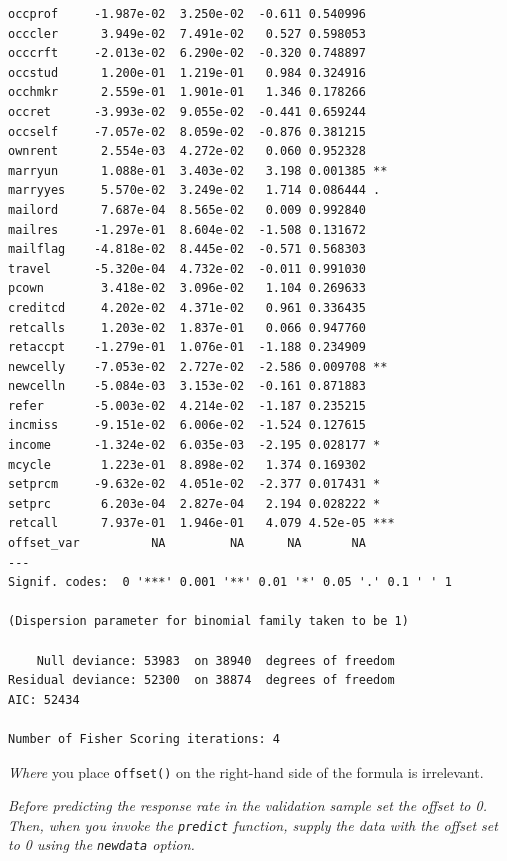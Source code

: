 \documentclass[
]{article}
\begin{document}
\begin{verbatim}
occprof     -1.987e-02  3.250e-02  -0.611 0.540996    
occcler      3.949e-02  7.491e-02   0.527 0.598053    
occcrft     -2.013e-02  6.290e-02  -0.320 0.748897    
occstud      1.200e-01  1.219e-01   0.984 0.324916    
occhmkr      2.559e-01  1.901e-01   1.346 0.178266    
occret      -3.993e-02  9.055e-02  -0.441 0.659244    
occself     -7.057e-02  8.059e-02  -0.876 0.381215    
ownrent      2.554e-03  4.272e-02   0.060 0.952328    
marryun      1.088e-01  3.403e-02   3.198 0.001385 ** 
marryyes     5.570e-02  3.249e-02   1.714 0.086444 .  
mailord      7.687e-04  8.565e-02   0.009 0.992840    
mailres     -1.297e-01  8.604e-02  -1.508 0.131672    
mailflag    -4.818e-02  8.445e-02  -0.571 0.568303    
travel      -5.320e-04  4.732e-02  -0.011 0.991030    
pcown        3.418e-02  3.096e-02   1.104 0.269633    
creditcd     4.202e-02  4.371e-02   0.961 0.336435    
retcalls     1.203e-02  1.837e-01   0.066 0.947760    
retaccpt    -1.279e-01  1.076e-01  -1.188 0.234909    
newcelly    -7.053e-02  2.727e-02  -2.586 0.009708 ** 
newcelln    -5.084e-03  3.153e-02  -0.161 0.871883    
refer       -5.003e-02  4.214e-02  -1.187 0.235215    
incmiss     -9.151e-02  6.006e-02  -1.524 0.127615    
income      -1.324e-02  6.035e-03  -2.195 0.028177 *  
mcycle       1.223e-01  8.898e-02   1.374 0.169302    
setprcm     -9.632e-02  4.051e-02  -2.377 0.017431 *  
setprc       6.203e-04  2.827e-04   2.194 0.028222 *  
retcall      7.937e-01  1.946e-01   4.079 4.52e-05 ***
offset_var          NA         NA      NA       NA    
---
Signif. codes:  0 '***' 0.001 '**' 0.01 '*' 0.05 '.' 0.1 ' ' 1

(Dispersion parameter for binomial family taken to be 1)

    Null deviance: 53983  on 38940  degrees of freedom
Residual deviance: 52300  on 38874  degrees of freedom
AIC: 52434

Number of Fisher Scoring iterations: 4
\end{verbatim}

\emph{Where} you place \texttt{offset()} on the right-hand side of the
formula is irrelevant.

\medskip

\emph{Before predicting the response rate in the validation sample set
the offset to 0. Then, when you invoke the \texttt{predict} function,
supply the data with the offset set to 0 using the \texttt{newdata}
option.}
\end{document}
